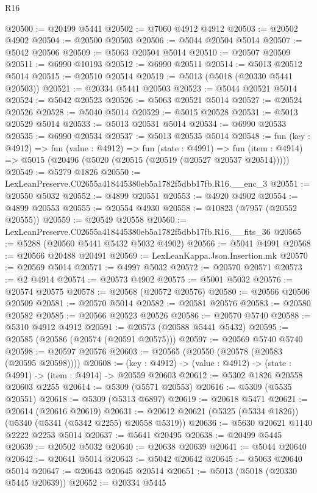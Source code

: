\begin{lexlean}{R16}
\begin{coremodule}
@20500 := @20499 @5441
@20502 := @7060 @4912 @4912
@20503 := @20502 @4902
@20504 := @20500 @20503
@20506 := @5044 @20504 @5014
@20507 := @5042 @20506
@20509 := @5063 @20504 @5014
@20510 := @20507 @20509
@20511 := @6990 @10193
@20512 := @6990 @20511
@20514 := @5013 @20512 @5014
@20515 := @20510 @20514
@20519 := @5013 (@5018 (@20330 @5441 @20503))
@20521 := @20334 @5441 @20503
@20523 := @5044 @20521 @5014
@20524 := @5042 @20523
@20526 := @5063 @20521 @5014
@20527 := @20524 @20526
@20528 := @5040 @5014
@20529 := @5015 @20528
@20531 := @5013 @20529 @5014
@20533 := @5013 @20531 @5014
@20534 := @6990 @20533
@20535 := @6990 @20534
@20537 := @5013 @20535 @5014
@20548 := fun (key : @4912) =>
  fun (value : @4912) =>
  fun (state : @4991) =>
  fun (item : @4914) => @5015 (@20496 (@5020 (@20515 (@20519 (@20527 @20537 @20514)))))
@20549 := @5279 @1826
@20550 := LexLeanPreserve.C02655a418445380eb5a1782f5dbb17fb.R16.__enc_3
@20551 := @20550 @5032
@20552 := @4899 @20551
@20553 := @4920 @4902
@20554 := @4899 @20553
@20555 := @20554 @4930
@20558 := @10823 (@7957 (@20552 @20555))
@20559 := @20549 @20558
@20560 := LexLeanPreserve.C02655a418445380eb5a1782f5dbb17fb.R16.__fits_36
@20565 := @5288 (@20560 @5441 @5432 @5032 @4902)
@20566 := @5041 @4991
@20568 := @20566 @20488 @20491
@20569 := LexLeanKappa.Json.Insertion.mk
@20570 := @20569 @5014
@20571 := @4997 @5032
@20572 := @20570 @20571
@20573 := @2 @4914
@20574 := @20573 @4902
@20575 := @5001 @5032
@20576 := @20574 @20575
@20578 := @20568 (@20572 @20576)
@20580 := @20566 @20506 @20509
@20581 := @20570 @5014
@20582 := @20581 @20576
@20583 := @20580 @20582
@20585 := @20566 @20523 @20526
@20586 := @20570 @5740
@20588 := @5310 @4912 @4912
@20591 := @20573 (@20588 @5441 @5432)
@20595 := @20585 (@20586 (@20574 (@20591 @20575)))
@20597 := @20569 @5740 @5740
@20598 := @20597 @20576
@20603 := @20565 (@20550 (@20578 (@20583 (@20595 @20598))))
@20608 := (key : @4912) -> (value : @4912) -> (state : @4991) -> (item : @4914) -> @20559 @20603
@20612 := @5302 @1826 @20558 @20603 @2255
@20614 := @5309 (@5571 @20553)
@20616 := @5309 (@5535 @20551)
@20618 := @5309 (@5313 @6897)
@20619 := @20618 @5471
@20621 := @20614 (@20616 @20619)
@20631 := @20612 @20621 (@5325 (@5334 @1826)) (@5340 (@5341 (@5342 @2255) @20558 @5319))
@20636 := @5630 @20621 @1140 @2222 @2253 @5014
@20637 := @5641 @20495
@20638 := @20499 @5445
@20639 := @20502 @5032
@20640 := @20638 @20639
@20641 := @5044 @20640
@20642 := @20641 @5014
@20643 := @5042 @20642
@20645 := @5063 @20640 @5014
@20647 := @20643 @20645 @20514
@20651 := @5013 (@5018 (@20330 @5445 @20639))
@20652 := @20334 @5445

\end{coremodule}
\end{lexlean}
